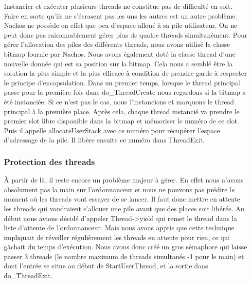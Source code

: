 \documentclass[10pt]{article}
\begin{document}
Instancier et exécuter plusieurs threads ne constitue pas de difficulté en soit.
Faire en sorte qu'ils ne s'écrasent pas les uns les autres est un autre problème.
Nachos ne possède en effet que peu d'espace alloué à sa pile utilisateur.
On ne peut donc pas raisonnablement gérer plus de quatre threads simultanément.
Pour gérer l'allocation des piles des différents threads, nous avons utilisé la classe
bitmap fournie par Nachos. Nous avons également doté la classe thread d'une nouvelle donnée
qui est sa position sur la bitmap.
Cela nous a semblé être la solution la plus simple et
la plus efficace à condition de prendre garde à respecter le principe d'encapsulation.
\newline
Dans un premier temps, lorsque le thread principal passe pour la première fois dans \textcolor{red2}{do\_ThreadCreate}
nous regardons si la bitmap a été instanciée. Si ce n'est pas le cas, nous l'instancions
et marquons le thread principal à la première place.
Après cela, chaque thread instancié va prendre le premier slot libre disponible dans
la bitmap et mémoriser le numéro de ce slot. Puis il appelle \textcolor{red2}{allocateUserStack} avec ce
numéro pour récupérer l'espace d'adressage de la pile.
Il libère ensuite ce numéro dans \textcolor{blue2}{ThreadExit}.

\subsubsection{Protection des threads}

À partir de là, il reste encore un problème majeur à gérer. En effet nous n'avons absolument
pas la main sur l'ordonnanceur et nous ne pouvons pas prédire le moment où les threads
vont essayer de se lancer. Il faut donc mettre en attente les threads qui voudraient
s'allouer une pile avant que des places soit libérée. Au début nous avions décidé
d'appeler \textcolor{red2}{Thread->yield} qui remet le thread dans la liste d'attente de l'ordonnanceur.
\newline
Mais nous avons appris que cette technique impliquait de réveiller régulièrement les
threads en attente pour rien, ce qui gâchait du temps d'exécution.
Nous avons donc créé un gros sémaphore qui laisse passer 3 threads (le nombre maximum de threads
simultanés -1 pour le main) et dont l'entrée se situe au début de \textcolor{red2}{StartUserThread}, et la sortie dans \textcolor{red2}{do\_ThreadExit}.
\end{document}
